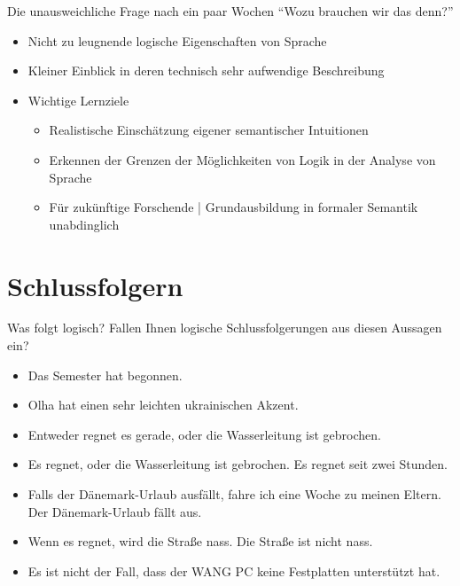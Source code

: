 \begin{frame}
  {Die unausweichliche Frage nach ein paar Wochen }
  \onslide<+->
  \onslide<+->
  \onslide<+->
  "`Wozu brauchen wir das denn?"'\\
  \Halbzeile
  \begin{itemize}[<+->]
    \item Nicht zu leugnende \alert{logische Eigenschaften von Sprache}
    \item Kleiner Einblick in deren \alert{technisch sehr aufwendige Beschreibung}
      \Halbzeile
    \item Wichtige Lernziele
      \begin{itemize}[<+->]
        \item Realistische Einschätzung \alert{eigener semantischer Intuitionen}
        \item Erkennen der \alert{Grenzen der Möglichkeiten von Logik} in der Analyse von Sprache
        \item Für zukünftige Forschende | \alert{Grundausbildung in formaler Semantik unabdinglich}
      \end{itemize}
  \end{itemize}
\end{frame}

\section{Schlussfolgern}

\begin{frame}
  {Was folgt logisch?}
  \onslide<+->
  \onslide<+->
  Fallen Ihnen logische Schlussfolgerungen aus diesen Aussagen ein?\\
  \Halbzeile
  \begin{itemize}[<+->]
    \item Das Semester hat begonnen.
    \item Olha hat einen sehr leichten ukrainischen Akzent.
    \item Entweder regnet es gerade, oder die Wasserleitung ist gebrochen.
    \item Es regnet, oder die Wasserleitung ist gebrochen. Es regnet seit zwei Stunden.
    \item Falls der Dänemark-Urlaub ausfällt, fahre ich eine Woche zu meinen Eltern.\\
      Der Dänemark-Urlaub fällt aus.
    \item Wenn es regnet, wird die Straße nass. Die Straße ist nicht nass.
    \item Es ist nicht der Fall, dass der WANG PC keine Festplatten unterstützt hat.
  \end{itemize}
\end{frame}

